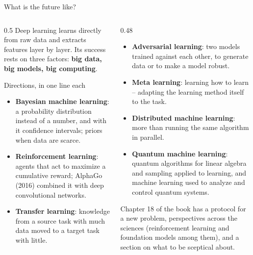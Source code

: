 \documentclass[10pt,aspectratio=169]{beamer}
\begin{document}
\begin{frame}{What is the future like?}
\begin{columns}[T]
\begin{column}{0.5\textwidth}
\small
Deep learning learns directly from raw data and extracts features layer by
layer.  Its success rests on three factors: \textbf{big data, big models,
big computing}.

\begin{block}{Directions, in one line each}
\footnotesize
\begin{itemize}
  \item \textbf{Bayesian machine learning}: a probability distribution
    instead of a number, and with it confidence intervals; priors when data
    are scarce.
  \item \textbf{Reinforcement learning}: agents that act to maximize a
    cumulative reward; AlphaGo (2016) combined it with deep convolutional
    networks.
  \item \textbf{Transfer learning}: knowledge from a source task with much
    data moved to a target task with little.
\end{itemize}
\end{block}
\end{column}
\begin{column}{0.48\textwidth}
\small
\begin{block}{}
\footnotesize
\begin{itemize}
  \item \textbf{Adversarial learning}: two models trained against each
    other, to generate data or to make a model robust.
  \item \textbf{Meta learning}: learning how to learn -- adapting the
    learning method itself to the task.
  \item \textbf{Distributed machine learning}: more than running the same
    algorithm in parallel.
  \item \textbf{Quantum machine learning}: quantum algorithms for linear
    algebra and sampling applied to learning, and machine learning used to
    analyze and control quantum systems.
\end{itemize}
\end{block}
\footnotesize
Chapter 18 of the book has a protocol for a new problem, perspectives
across the sciences (reinforcement learning and foundation models among
them), and a section on what to be sceptical about.
\end{column}
\end{columns}
\end{frame}
\end{document}
